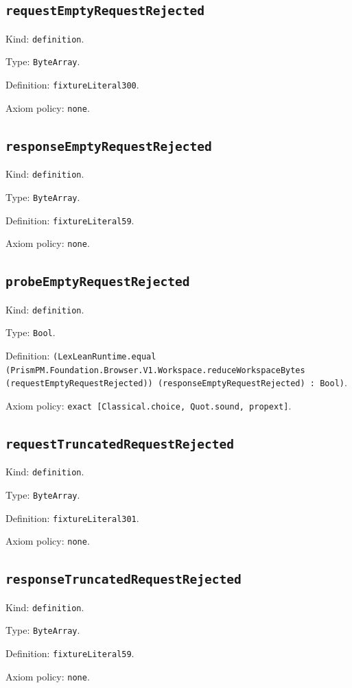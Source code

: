 \documentclass[11pt]{article}
\begin{document}
\subsection*{\texttt{requestEmptyRequestRejected}}
\noindent Kind: \texttt{definition}.\par
\noindent Type: \texttt{ByteArray}.\par
\noindent Definition: \texttt{fixtureLiteral300}.\par
\noindent Axiom policy: \texttt{none}.\par
\subsection*{\texttt{responseEmptyRequestRejected}}
\noindent Kind: \texttt{definition}.\par
\noindent Type: \texttt{ByteArray}.\par
\noindent Definition: \texttt{fixtureLiteral59}.\par
\noindent Axiom policy: \texttt{none}.\par
\subsection*{\texttt{probeEmptyRequestRejected}}
\noindent Kind: \texttt{definition}.\par
\noindent Type: \texttt{Bool}.\par
\noindent Definition: \texttt{(LexLeanRuntime.equal (PrismPM.Foundation.Browser.V1.Workspace.reduceWorkspaceBytes (requestEmptyRequestRejected)) (responseEmptyRequestRejected) : Bool)}.\par
\noindent Axiom policy: \texttt{exact [Classical.choice, Quot.sound, propext]}.\par
\subsection*{\texttt{requestTruncatedRequestRejected}}
\noindent Kind: \texttt{definition}.\par
\noindent Type: \texttt{ByteArray}.\par
\noindent Definition: \texttt{fixtureLiteral301}.\par
\noindent Axiom policy: \texttt{none}.\par
\subsection*{\texttt{responseTruncatedRequestRejected}}
\noindent Kind: \texttt{definition}.\par
\noindent Type: \texttt{ByteArray}.\par
\noindent Definition: \texttt{fixtureLiteral59}.\par
\noindent Axiom policy: \texttt{none}.\par
\end{document}
